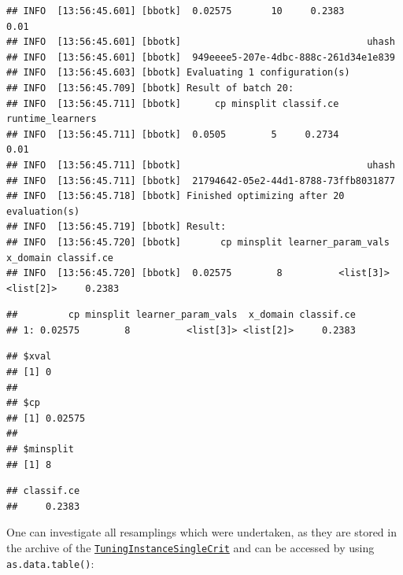 \documentclass[
]{scrbook}
\newenvironment{Shaded}{\begin{snugshade}}{\end{snugshade}}
\newcommand{\NormalTok}[1]{#1}
\newcommand{\SpecialCharTok}[1]{\textcolor[rgb]{0.00,0.00,0.00}{#1}}
\renewenvironment{Shaded} {\begin{snugshade}\small} {\end{snugshade}}
\begin{document}
\begin{verbatim}
## INFO  [13:56:45.601] [bbotk]  0.02575       10     0.2383             0.01 
## INFO  [13:56:45.601] [bbotk]                                 uhash 
## INFO  [13:56:45.601] [bbotk]  949eeee5-207e-4dbc-888c-261d34e1e839 
## INFO  [13:56:45.603] [bbotk] Evaluating 1 configuration(s) 
## INFO  [13:56:45.709] [bbotk] Result of batch 20: 
## INFO  [13:56:45.711] [bbotk]      cp minsplit classif.ce runtime_learners 
## INFO  [13:56:45.711] [bbotk]  0.0505        5     0.2734             0.01 
## INFO  [13:56:45.711] [bbotk]                                 uhash 
## INFO  [13:56:45.711] [bbotk]  21794642-05e2-44d1-8788-73ffb8031877 
## INFO  [13:56:45.718] [bbotk] Finished optimizing after 20 evaluation(s) 
## INFO  [13:56:45.719] [bbotk] Result: 
## INFO  [13:56:45.720] [bbotk]       cp minsplit learner_param_vals  x_domain classif.ce 
## INFO  [13:56:45.720] [bbotk]  0.02575        8          <list[3]> <list[2]>     0.2383
\end{verbatim}

\begin{verbatim}
##         cp minsplit learner_param_vals  x_domain classif.ce
## 1: 0.02575        8          <list[3]> <list[2]>     0.2383
\end{verbatim}

\begin{Shaded}
\end{Shaded}

\begin{verbatim}
## $xval
## [1] 0
## 
## $cp
## [1] 0.02575
## 
## $minsplit
## [1] 8
\end{verbatim}

\begin{Shaded}
\end{Shaded}

\begin{verbatim}
## classif.ce 
##     0.2383
\end{verbatim}

One can investigate all resamplings which were undertaken, as they are stored in the archive of the \href{https://mlr3tuning.mlr-org.com/reference/TuningInstanceSingleCrit.html}{\texttt{TuningInstanceSingleCrit}} and can be accessed by using \texttt{as.data.table()}:
\end{document}
